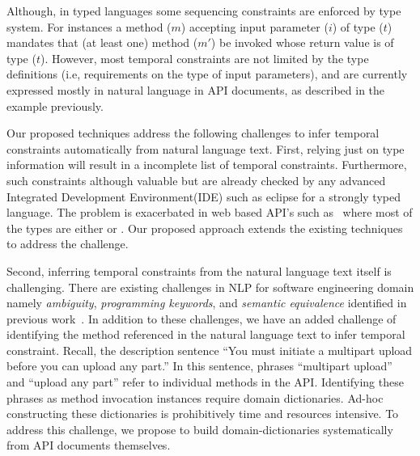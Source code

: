 Although, in typed languages some sequencing constraints are enforced by type system. 
For instances a method ($m$) accepting input parameter ($i$) of type ($t$) mandates that (at least one) method ($m'$) be invoked whose return value is of type ($t$).  However, most temporal constraints are not limited by the type definitions (i.e, requirements on the type of input parameters), and are currently expressed mostly in natural language in API documents, as described in the example previously.

Our proposed techniques address the following challenges to infer temporal constraints automatically from natural language text.
First, relying just on type information will result in a incomplete list of temporal constraints. 
Furthermore, such constraints although valuable but are already checked by any advanced Integrated Development Environment(IDE) such as eclipse
for a strongly typed language.
The problem is exacerbated in web based API's such as \amazonAPI\ where most of the types are either  or .
Our proposed approach extends the existing techniques to address the challenge.

Second, inferring temporal constraints from the natural language text itself is challenging. 
There are existing challenges in NLP for software engineering domain namely \textit{ambiguity}, \textit{programming keywords}, and \textit{semantic equivalence} identified in previous work~\cite{pandita12:inferring}.
In addition to these challenges, we have an added challenge of identifying the method referenced in the natural language text to infer temporal constraint.
Recall, the description sentence ``You must initiate a multipart upload before you can upload any part.''
In this sentence, phrases ``multipart upload'' and ``upload any part'' refer to individual methods in the API.
Identifying these phrases as method invocation instances require domain dictionaries.
Ad-hoc constructing these dictionaries is prohibitively time and resources intensive.
To address this challenge, we propose to build domain-dictionaries systematically from API documents themselves.  

